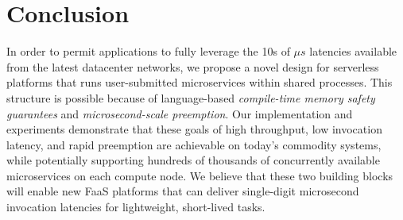 \section{Conclusion}
\label{sec:concl}

In order to permit applications to fully leverage the 10s of $\mu{}s$
latencies available from the latest datacenter networks, we propose a novel design
for serverless platforms that runs user-submitted microservices within shared
processes.  This structure is possible because of language-based
\textit{compile-time memory safety guarantees} and \textit{microsecond-scale
preemption}.  Our implementation and experiments demonstrate that these goals of
high throughput, low invocation latency, and rapid preemption are achievable
on today's commodity systems, while potentially supporting hundreds of thousands of
concurrently available microservices on each compute node.  We believe that these
two building blocks will enable new FaaS platforms that can deliver single-digit
microsecond invocation latencies for lightweight, short-lived tasks.
